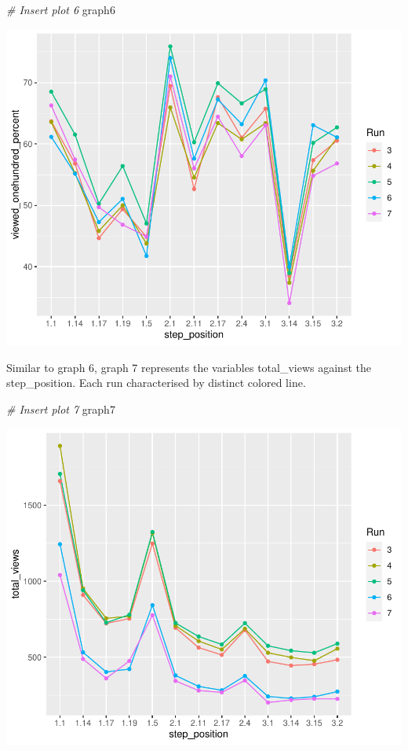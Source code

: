 \documentclass[12pt,]{article}
\newenvironment{Shaded}{\begin{snugshade}}{\end{snugshade}}
\newcommand{\CommentTok}[1]{\textcolor[rgb]{0.56,0.35,0.01}{\textit{#1}}}
\newcommand{\NormalTok}[1]{#1}
\begin{document}
\begin{Shaded}
\begin{Highlighting}[]
\CommentTok{\# Insert plot 6}
\NormalTok{graph6}
\end{Highlighting}
\end{Shaded}

\begin{center}\includegraphics{report_files/figure-latex/unnamed-chunk-8-1} \end{center}

Similar to graph 6, graph 7 represents the variables total\_views
against the step\_position. Each run characterised by distinct colored
line.

\begin{Shaded}
\begin{Highlighting}[]
\CommentTok{\# Insert plot 7}
\NormalTok{graph7}
\end{Highlighting}
\end{Shaded}

\begin{center}\includegraphics{report_files/figure-latex/unnamed-chunk-9-1} \end{center}
\end{document}
